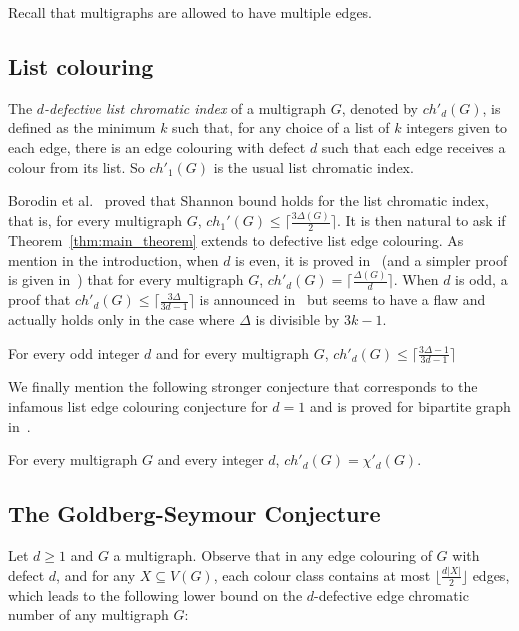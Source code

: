 Recall that multigraphs are allowed to have multiple edges. 

\subsection*{List colouring}
The \textit{$d$-defective list chromatic index} of a multigraph $G$, denoted by $ch'_d(G)$, is defined as the minimum $k$ such that, for any choice of a list of $k$ integers given to each edge, there is an edge colouring with defect $d$ such that each edge receives a colour from its list.  So $ch'_1(G)$ is the usual list chromatic index. 

Borodin et al.~\cite{10.1006/jctb.1997.1780} proved that Shannon bound holds for the list chromatic index, that is, for every multigraph $G$, 
$ch_1'(G) \leq \lceil \frac{3 \Delta(G)}{2} \rceil$. It is then natural to ask if Theorem~\ref{thm:main_theorem} extends to defective list edge colouring. 
As mention in the introduction, when $d$ is even, it is proved in~\cite{HILTON2001253} (and a simpler proof is given in~\cite{amini:inria-00144318}) that for every multigraph $G$,  $ch'_d(G) = \lceil \frac{\Delta(G)}{d} \rceil$. 
When $d$ is odd, a proof that $ch'_{d}(G) \leq \lceil \frac{3\Delta}{3d - 1} \rceil$ is announced in~\cite{amini:inria-00144318} but seems to have a flaw and actually holds only in the case where $\Delta$ is divisible by $3k-1$. 

\begin{conjecture}
For every odd integer $d$ and for every  multigraph $G$, $ch'_d(G) \leq  \lceil \frac{3\Delta - 1}{3d-1} \rceil$
\end{conjecture}


We finally mention the following stronger conjecture that corresponds to the infamous list edge colouring conjecture for $d=1$ and is proved for bipartite graph in~\cite{HILTON2001253}. 

\begin{conjecture}
For every multigraph $G$ and every integer $d$, $ch'_d(G) = \chi'_d(G)$.
\end{conjecture}

\subsection*{The Goldberg-Seymour Conjecture}
Let $d \geq 1$ and $G$ a multigraph. Observe that in any edge colouring of $G$ with defect $d$, and for any $X \subseteq V(G)$, each colour class contains at most $\lfloor \frac{d|X|}{2} \rfloor$ edges, which leads to the following lower bound on the $d$-defective edge chromatic number of any multigraph $G$: 

